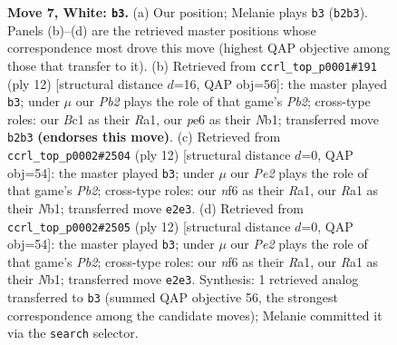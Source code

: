 \documentclass[11pt]{article}
\begin{document}
\begin{figure}[p]
\caption{\textbf{Move 7, White: \texttt{b3}.} (a) Our position; Melanie plays \texttt{b3} (\texttt{b2b3}). Panels (b)--(d) are the retrieved master positions whose correspondence most drove this move (highest QAP objective among those that transfer to it). (b) Retrieved from \texttt{ccrl\_top\_p0001\#191} (ply 12) [structural distance $d$=16, QAP obj=56]: the master played \texttt{b3}; under $\mu$ our \emph{Pb2} plays the role of that game's \emph{Pb2}; cross-type roles: our \emph{B}c1 as their \emph{R}a1, our \emph{p}e6 as their \emph{N}b1; transferred move \texttt{b2b3} \textbf{(endorses this move)}. (c) Retrieved from \texttt{ccrl\_top\_p0002\#2504} (ply 12) [structural distance $d$=0, QAP obj=54]: the master played \texttt{b3}; under $\mu$ our \emph{Pe2} plays the role of that game's \emph{Pb2}; cross-type roles: our \emph{n}f6 as their \emph{R}a1, our \emph{R}a1 as their \emph{N}b1; transferred move \texttt{e2e3}. (d) Retrieved from \texttt{ccrl\_top\_p0002\#2505} (ply 12) [structural distance $d$=0, QAP obj=54]: the master played \texttt{b3}; under $\mu$ our \emph{Pe2} plays the role of that game's \emph{Pb2}; cross-type roles: our \emph{n}f6 as their \emph{R}a1, our \emph{R}a1 as their \emph{N}b1; transferred move \texttt{e2e3}. Synthesis: 1 retrieved analog transferred to \texttt{b3} (summed QAP objective 56, the strongest correspondence among the candidate moves); Melanie committed it via the \texttt{search} selector.}
\label{fig:thought-m12}
\end{figure}

\clearpage
\end{document}
